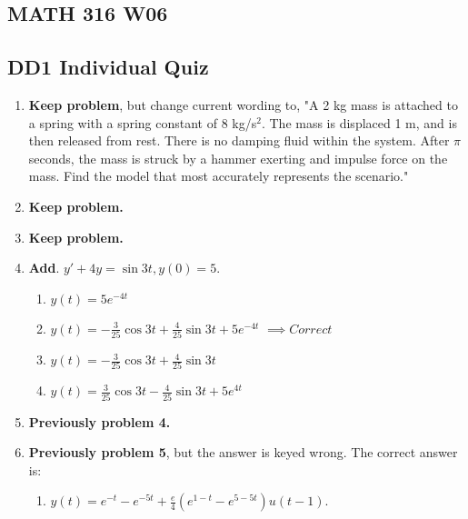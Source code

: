 \documentclass[11pt]{article}
\begin{document}
	
\begin{center}\section*{MATH 316 W06}\end{center}
\subsection*{DD1 Individual Quiz}
\begin{enumerate}

	\item \textbf{Keep problem}, but change current wording to, "A 2 kg mass is attached to a spring with a spring constant of 8 kg/s$^2$. The mass is displaced 1 m, and is then released from rest. There is no damping fluid within the system. After $\pi$ seconds, the mass is struck by a hammer exerting and impulse force on the mass. Find the model that most accurately represents the scenario."
	\item \textbf{Keep problem.}
	
	\item \textbf{Keep problem.}
	
	\item \textbf{Add}. $y\prime + 4y=\sin{3t}, y(0)=5.$
		\begin{enumerate}
			\item $y(t)=5e^{-4t}$
			\item $y(t)=-\frac{3}{25}\cos{3t}+\frac{4}{25}\sin{3t}+5e^{-4t}$ $\implies{Correct}$
			\item $y(t)=-\frac{3}{25}\cos{3t}+\frac{4}{25}\sin{3t}$
			\item $y(t)=\frac{3}{25}\cos{3t}-\frac{4}{25}\sin{3t}+5e^{4t}$
		\end{enumerate}
			
	\item \textbf{Previously problem 4.}
	
	\item  \textbf{Previously problem 5}, but the answer is keyed wrong. 					The correct answer is:
					\begin{enumerate}
						\item $y(t)=e^{-t}-e^{-5t}+\frac{e}{4}(e^{1-t}-							e^{5-5t}) u(t-1).$
					\end{enumerate}
\end{enumerate}
\end{document}
